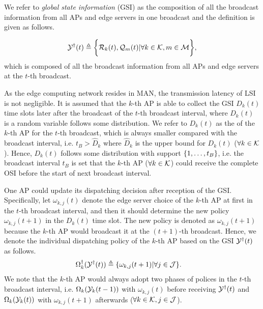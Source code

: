 We refer to \emph{global state information} (GSI) as the composition of all the broadcast information from all APs and edge servers in one broadcast and the definition is given as follows.
\begin{definition}
    \begin{align}
        \mathcal{Y}^{\dagger}(t) \triangleq
            \bigg\{
                \mathcal{R}_{k}(t), \mathcal{Q}_{m}(t) | \forall k\in\mathcal{K}, m\in\mathcal{M}
            \bigg\},
    \end{align}
    which is composed of all the broadcast information from all APs and edge servers at the $t$-th broadcast.
\end{definition}

As the edge computing network resides in MAN, the transmission latency of LSI is not negligible.
It is assumed that the $k$-th AP is able to collect the GSI $D_{k}(t)$ time slots later after the broadcast of the $t$-th broadcast interval, where $D_{k}(t)$ is a random variable follows some distribution.
We refer to $D_{k}(t)$ as the \brlatency of the $k$-th AP for the $t$-th broadcast, which is always smaller compared with the broadcast interval, i.e. $t_B > \hat{D}_{k}$ where $\hat{D}_{k}$ is the upper bound for $D_{k}(t)$ ($\forall k\in\mathcal{K}$).
Hence, $D_{k}(t)$ follows some distribution with support $\{1,\dots,t_B\}$, i.e. the broadcast interval $t_B$ is set that the $k$-th AP ($\forall k\in\mathcal{K}$) could receive the complete OSI before the start of next broadcast interval.

One AP could update its dispatching decision after reception of the GSI.
Specifically, let $\omega_{k,j}(t)$ denote the edge server choice of the $k$-th AP at first in the $t$-th broadcast interval, and then it should determine the new policy $\omega_{k,j}(t+1)$ in the $D_{k}(t)$ time slot.
The new policy is denoted as $\omega_{k,j}(t+1)$ because the $k$-th AP would broadcast it at the $(t+1)$-th broadcast.
Hence, we denote the individual dispatching policy of the $k$-th AP based on the GSI $\mathcal{Y}^{\dagger}(t)$ as follows.
\begin{align}
    &\Omega^{\dagger}_{k}(\mathcal{Y}^{\dagger}(t)) \triangleq \{\omega_{k,j}(t+1)|\forall j\in\mathcal{J}\}.
    \label{def_action}
\end{align}
We note that the $k$-th AP would always adopt two phases of polices in the $t$-th broadcast interval, i.e. $\Omega_{k}(\mathcal{Y}_{k}(t-1))$ with $\omega_{k,j}(t)$ before receiving $\mathcal{Y}^{\dagger}(t)$ and $\Omega_{k}(\mathcal{Y}_{k}(t))$ with $\omega_{k,j}(t+1)$ afterwards ($\forall k\in\mathcal{K}, j\in\mathcal{J}$).


